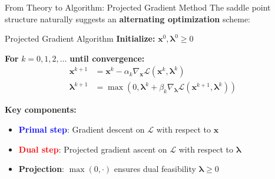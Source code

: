 \documentclass[aspectratio=1610]{beamer}
\begin{document}
\begin{frame}{From Theory to Algorithm: Projected Gradient Method}
  The saddle point structure naturally suggests an \textbf{alternating optimization} scheme:
  
  \vspace{0.5cm}
  \begin{block}{Projected Gradient Algorithm}
    \textbf{Initialize:} $\mathbf{x}^0, \boldsymbol{\lambda}^0 \geq 0$
    
    \textbf{For} $k = 0, 1, 2, \ldots$ \textbf{until convergence:}
    \begin{align}
      \mathbf{x}^{k+1} &= \mathbf{x}^k - \alpha_k \nabla_{\mathbf{x}} \mathcal{L}(\mathbf{x}^k, \boldsymbol{\lambda}^k) \tag{Primal descent}\\
      \boldsymbol{\lambda}^{k+1} &= \max(0, \boldsymbol{\lambda}^k + \beta_k \nabla_{\boldsymbol{\lambda}} \mathcal{L}(\mathbf{x}^{k+1}, \boldsymbol{\lambda}^k)) \tag{Dual ascent}
    \end{align}
  \end{block}
  
  \vspace{0.3cm}
  \textbf{Key components:}
  \begin{itemize}
    \item \textcolor{blue}{\textbf{Primal step}}: Gradient descent on $\mathcal{L}$ with respect to $\mathbf{x}$
    \item \textcolor{red}{\textbf{Dual step}}: Projected gradient ascent on $\mathcal{L}$ with respect to $\boldsymbol{\lambda}$
    \item \textbf{Projection}: $\max(0, \cdot)$ ensures dual feasibility $\boldsymbol{\lambda} \geq 0$
  \end{itemize}
\end{frame}
\end{document}
